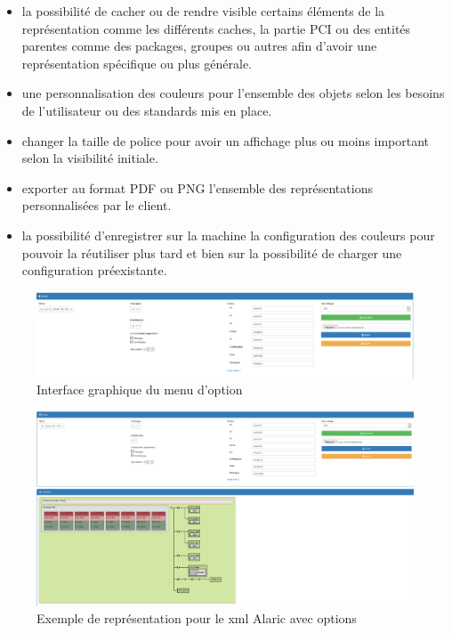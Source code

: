 \documentclass [a4paper,11pt]{article}
\begin{document}
\begin{itemize}
\item la possibilité de cacher ou de rendre visible certains éléments de la représentation comme les différents caches, la partie PCI ou des entités parentes comme des packages, groupes ou autres afin d'avoir une représentation spécifique ou plus générale.
\item une personnalisation des couleurs pour l'ensemble des objets selon les besoins de l'utilisateur ou des standards mis en place.
\item changer la taille de police pour avoir un affichage plus ou moins important selon la visibilité initiale. 
\item exporter au format PDF ou PNG l'ensemble des représentations personnalisées par le client.
\item la possibilité d'enregistrer sur la machine la configuration des couleurs pour pouvoir la réutiliser plus tard et bien sur la possibilité de charger une configuration préexistante.
\end{itemize}

\begin{figure}[!h]
\centering
\includegraphics[scale=0.3]{img/filtre.png}
\caption[Résultats]{ Interface graphique du menu d'option }
\end{figure}

\begin{figure}[!h]
\centering
\includegraphics[scale=0.3]{img/alaric_modif.png}
\caption[Résultats]{Exemple de représentation pour le xml Alaric avec options}
\end{figure}
\end{document}
